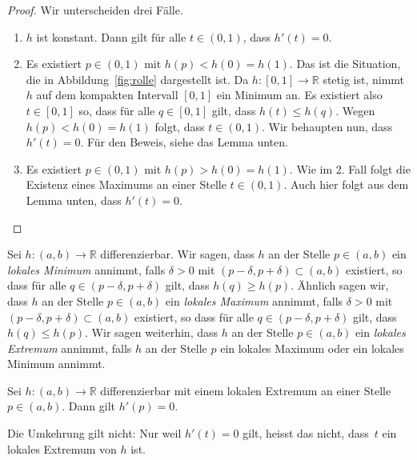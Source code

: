 \documentclass[../main.tex]{subfiles}
\begin{document}
\begin{proof}
  Wir unterscheiden drei Fälle.
  \begin{enumerate}[1.]
    \item $h$ ist konstant.
      Dann gilt für alle $t\in (0, 1)$,
      dass $h'(t) = 0$.
    \item Es existiert $p \in (0, 1)$
      mit $h(p) < h(0) = h(1)$.
      Das ist die Situation, die in
      Abbildung~\ref{fig:rolle} dargestellt ist.
      Da $h \colon [0, 1] \to \mathbb{R}$
      stetig ist, nimmt $h$ auf dem
      kompakten Intervall
      $[0, 1]$ ein Minimum an.
      Es existiert also $t \in [0, 1]$
      so, dass für alle $q \in [0, 1]$
      gilt, dass
      $h(t) \leq h(q)$.
      Wegen $h(p) < h(0) = h(1)$ folgt,
      dass $t \in (0, 1)$.
      Wir behaupten nun, dass $h'(t) = 0$.
      Für den Beweis, siehe das Lemma unten.
    \item Es existiert $p \in (0, 1)$ mit
      $h(p) > h(0) = h(1)$. Wie im 2. Fall
      folgt die Existenz eines Maximums
      an einer Stelle $t \in (0, 1)$.
      Auch hier folgt aus dem Lemma unten,
      dass $h'(t) = 0$. \qedhere
  \end{enumerate}
\end{proof}

\begin{definition}
  Sei $h \colon (a, b) \to \mathbb{R}$ differenzierbar.
  Wir sagen, dass $h$ an der Stelle
  $p \in (a, b)$ ein \emph{lokales
  Minimum} annimmt, falls $\delta > 0$
  mit $ (p - \delta, p + \delta)
  \subset (a, b)$ existiert,
  so dass für alle $q \in (p - \delta, p + \delta)$
  gilt, dass  $h(q) \geq h(p)$. Ähnlich sagen wir,
  dass $h$ an der Stelle
  $p \in (a, b)$ ein \emph{lokales Maximum}
  annimmt, falls $\delta > 0$ mit
  $(p - \delta, p + \delta) \subset (a, b)$
  existiert, so dass für alle $q \in (p - \delta, p + \delta)$
  gilt, dass $h(q) \leq h(p)$.
  Wir sagen weiterhin, dass $h$ an der
  Stelle $p \in (a, b)$ ein
  \emph{lokales Extremum} annimmt, falls
  $h$ an der Stelle $p$
  ein lokales Maximum oder ein lokales Minimum
  annimmt.
\end{definition}


\begin{lemma*}
  Sei $h \colon (a, b) \to \mathbb{R}$
  differenzierbar mit einem lokalen
  Extremum an einer Stelle
  $p \in (a, b)$. Dann gilt $h'(p) = 0$.
\end{lemma*}

\begin{remark}
  Die Umkehrung gilt nicht: Nur weil $h'(t) = 0$
  gilt, heisst das nicht, dass~$t$ ein
  lokales Extremum von $h$ ist.
\end{remark}
\end{document}

